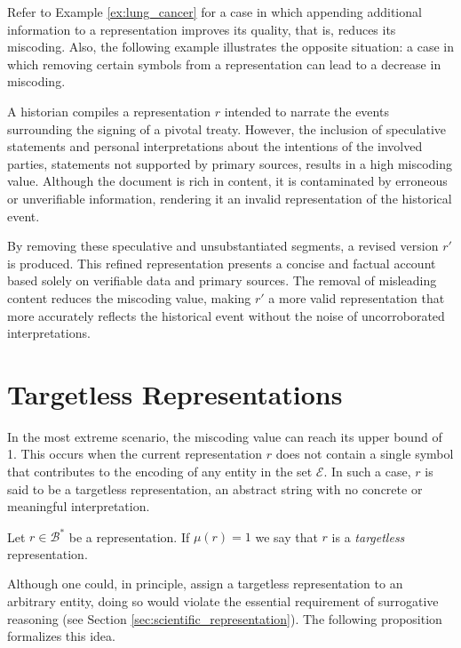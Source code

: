 Refer to Example \ref{ex:lung_cancer} for a case in which appending additional information to a representation improves its quality, that is, reduces its miscoding. Also, the following example illustrates the opposite situation: a case in which removing certain symbols from a representation can lead to a decrease in miscoding.

\begin{example}
A historian compiles a representation $r$ intended to narrate the events surrounding the signing of a pivotal treaty. However, the inclusion of speculative statements and personal interpretations about the intentions of the involved parties, statements not supported by primary sources, results in a high miscoding value. Although the document is rich in content, it is contaminated by erroneous or unverifiable information, rendering it an invalid representation of the historical event.

By removing these speculative and unsubstantiated segments, a revised version $r'$ is produced. This refined representation presents a concise and factual account based solely on verifiable data and primary sources. The removal of misleading content reduces the miscoding value, making $r'$ a more valid representation that more accurately reflects the historical event without the noise of uncorroborated interpretations.
\end{example}

%
%

\section{Targetless Representations}
\label{sec:targetless_representations}

In the most extreme scenario, the miscoding value can reach its upper bound of 1. This occurs when the current representation $r$ does not contain a single symbol that contributes to the encoding of any entity in the set $\mathcal{E}$. In such a case, $r$ is said to be a targetless representation, an abstract string with no concrete or meaningful interpretation.

\begin{definition}
Let $r \in \mathcal{B}^\ast$ be a representation. If $\mu(r) = 1$ we say that $r$ is a \emph{targetless} representation.
\end{definition} 

Although one could, in principle, assign a targetless representation to an arbitrary entity, doing so would violate the essential requirement of surrogative reasoning (see Section \ref{sec:scientific_representation}). The following proposition formalizes this idea.

